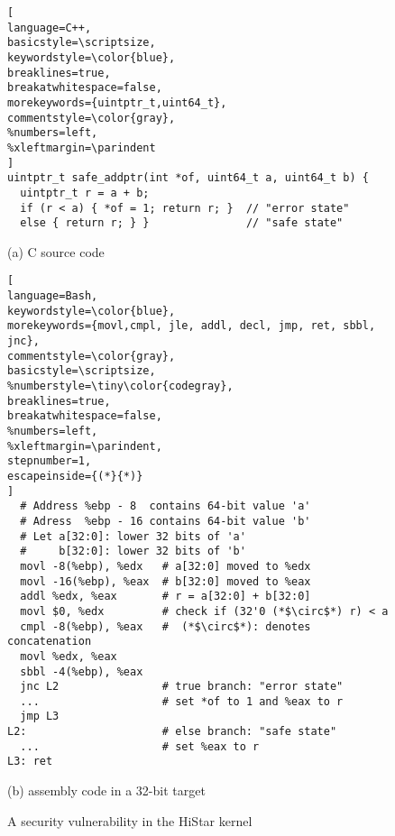 \begin{figure}
\begin{lstlisting}[
language=C++,
basicstyle=\scriptsize,
keywordstyle=\color{blue},
breaklines=true,
breakatwhitespace=false,
morekeywords={uintptr_t,uint64_t},
commentstyle=\color{gray},
%numbers=left,
%xleftmargin=\parindent
]
uintptr_t safe_addptr(int *of, uint64_t a, uint64_t b) {
  uintptr_t r = a + b;
  if (r < a) { *of = 1; return r; }  // "error state" 
  else { return r; } }               // "safe state" 
\end{lstlisting}
\vspace{-5pt}
\begin{center}
{\small (a) C source code}
\end{center}
\begin{lstlisting}[
language=Bash,
keywordstyle=\color{blue},
morekeywords={movl,cmpl, jle, addl, decl, jmp, ret, sbbl, jnc},
commentstyle=\color{gray},
basicstyle=\scriptsize,
%numberstyle=\tiny\color{codegray},
breaklines=true,
breakatwhitespace=false,
%numbers=left,
%xleftmargin=\parindent,
stepnumber=1,
escapeinside={(*}{*)}
]
  # Address %ebp - 8  contains 64-bit value 'a'  
  # Adress  %ebp - 16 contains 64-bit value 'b'
  # Let a[32:0]: lower 32 bits of 'a' 
  #     b[32:0]: lower 32 bits of 'b'
  movl -8(%ebp), %edx   # a[32:0] moved to %edx
  movl -16(%ebp), %eax  # b[32:0] moved to %eax
  addl %edx, %eax       # r = a[32:0] + b[32:0]
  movl $0, %edx         # check if (32'0 (*$\circ$*) r) < a
  cmpl -8(%ebp), %eax   #  (*$\circ$*): denotes concatenation
  movl %edx, %eax
  sbbl -4(%ebp), %eax
  jnc L2                # true branch: "error state"
  ...                   # set *of to 1 and %eax to r
  jmp L3
L2:                     # else branch: "safe state"
  ...                   # set %eax to r
L3: ret
\end{lstlisting}
\vspace{-5pt}
\begin{center}
{\small (b) \ISA assembly code in a 32-bit target}
\end{center}
\vspace*{-5pt}
\caption{A security vulnerability in the HiStar kernel}
\label{fig:histar}
\end{figure}

